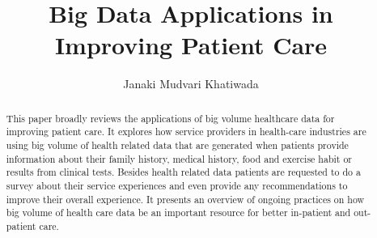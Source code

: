 \documentclass[sigconf]{acmart}
\begin{document}
\title{Big Data Applications in Improving Patient Care}


\author{Janaki Mudvari Khatiwada}
\orcid{}




\begin{abstract}
 This paper broadly reviews the applications of big volume healthcare data  for improving patient care. It  
 explores how service providers in health-care industries are using big volume of health related data that are 
 generated when patients provide information about their family history, medical history, food and exercise habit or 
 results from clinical tests. Besides health related data patients are requested to do a survey about their service 
 experiences and even provide any recommendations to improve their overall experience. It presents an overview of ongoing 
 practices on how big volume of health care data be an important resource for better in-patient and out-patient care.   
\end{abstract}


\maketitle
\end{document}
